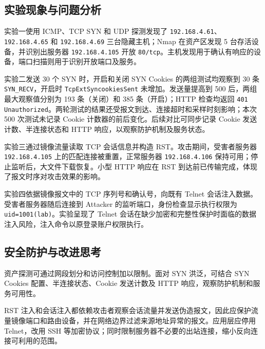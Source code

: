 \subsection{实验现象与问题分析}

实验一使用 ICMP、TCP SYN 和 UDP 探测发现了 \texttt{192.168.4.61}、\texttt{192.168.4.65} 和 \texttt{192.168.4.69} 三台隐藏主机；Nmap 在资产区发现 5 台存活设备，并识别出服务器 \texttt{192.168.4.105} 开放 \texttt{80/tcp}。主机发现用于确认有响应的设备，端口扫描则用于识别开放端口及服务。

实验二发送 30 个 SYN 时，开启和关闭 SYN Cookies 的两组测试均观察到 30 条 \texttt{SYN\_RECV}，开启时 \texttt{TcpExtSyncookiesSent} 未增加。发送量提高到 500 后，两组最大观察值分别为 193 条（关闭）和 385 条（开启）；HTTP 检查均返回 \texttt{401 Unauthorized}。两轮测试的结果还受报文到达、连接超时和采样时刻影响；本次 500 次测试未记录 Cookie 计数器的前后变化。后续对比可同步记录 Cookie 发送计数、半连接状态和 HTTP 响应，以观察防护机制及服务状态。

实验三通过镜像流量读取 TCP 会话信息并构造 RST。攻击期间，受害者服务器 \texttt{192.168.4.105} 上的匹配连接被重置，正常服务器 \texttt{192.168.4.106} 保持可用；停止监听后，大文件下载恢复。小型 HTTP 响应在 RST 到达前已传输完成，体现了报文时序对攻击效果的影响。

实验四依据镜像报文中的 TCP 序列号和确认号，向既有 Telnet 会话注入数据。受害者服务器随后连接到 Attacker 的监听端口，身份检查显示执行权限为 \texttt{uid=1001(lab)}。实验呈现了 Telnet 会话在缺少加密和完整性保护时面临的数据注入风险，注入命令以原登录账户权限执行。

\subsection{安全防护与改进思考}

资产探测可通过网段划分和访问控制加以限制。面对 SYN 洪泛，可结合 SYN Cookies 配置、半连接状态、Cookie 发送计数及 HTTP 响应，观察防护机制和服务可用性。

RST 注入和会话注入都依赖攻击者观察会话流量并发送伪造报文，因此应保护流量镜像端口和路由设备，并在网络边界过滤来源地址异常的报文。应用层应停用 Telnet，改用 SSH 等加密协议；同时限制服务器不必要的出站连接，缩小反向连接可利用的范围。
